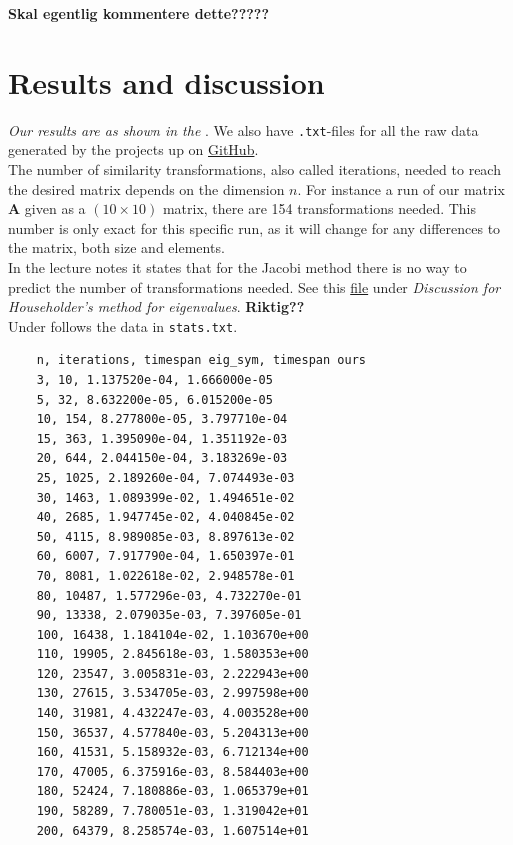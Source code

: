 \documentclass{article}
\begin{document}
\textbf{Skal egentlig kommentere dette?????} \\




\vspace{1cm}

\section{Results and discussion} \label{sec:Results}

  \textit{Our results are as shown in the }. We also have \texttt{.txt}-files for all the raw data generated by the projects up on \href{https://github.com/Erikbgram/Fys3150}{GitHub}. \\

  The number of similarity transformations, also called iterations, needed to reach the desired matrix depends on the dimension $n$. For instance a run of our matrix \textbf{A} given as a $(10 \times 10)$ matrix, there are 154 transformations needed. This number is only exact for this specific run, as it will change for any differences to the matrix, both size and elements. \\

  In the lecture notes it states that for the Jacobi method there is no way to predict the number of transformations needed. See this \href{http://compphysics.github.io/ComputationalPhysics/doc/pub/eigvalues/html/eigvalues.html}{file} under \textit{Discussion for Householder's method for eigenvalues}. \textbf{Riktig??} \\


  Under follows the data in \texttt{stats.txt}.

  \begin{verbatim}
    n, iterations, timespan eig_sym, timespan ours
    3, 10, 1.137520e-04, 1.666000e-05
    5, 32, 8.632200e-05, 6.015200e-05
    10, 154, 8.277800e-05, 3.797710e-04
    15, 363, 1.395090e-04, 1.351192e-03
    20, 644, 2.044150e-04, 3.183269e-03
    25, 1025, 2.189260e-04, 7.074493e-03
    30, 1463, 1.089399e-02, 1.494651e-02
    40, 2685, 1.947745e-02, 4.040845e-02
    50, 4115, 8.989085e-03, 8.897613e-02
    60, 6007, 7.917790e-04, 1.650397e-01
    70, 8081, 1.022618e-02, 2.948578e-01
    80, 10487, 1.577296e-03, 4.732270e-01
    90, 13338, 2.079035e-03, 7.397605e-01
    100, 16438, 1.184104e-02, 1.103670e+00
    110, 19905, 2.845618e-03, 1.580353e+00
    120, 23547, 3.005831e-03, 2.222943e+00
    130, 27615, 3.534705e-03, 2.997598e+00
    140, 31981, 4.432247e-03, 4.003528e+00
    150, 36537, 4.577840e-03, 5.204313e+00
    160, 41531, 5.158932e-03, 6.712134e+00
    170, 47005, 6.375916e-03, 8.584403e+00
    180, 52424, 7.180886e-03, 1.065379e+01
    190, 58289, 7.780051e-03, 1.319042e+01
    200, 64379, 8.258574e-03, 1.607514e+01
  \end{verbatim}
\end{document}
